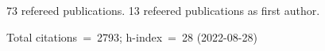 73 refereed publications. 13 refeered publications as first author.

Total citations~=~2793; h-index~=~28 (2022-08-28)